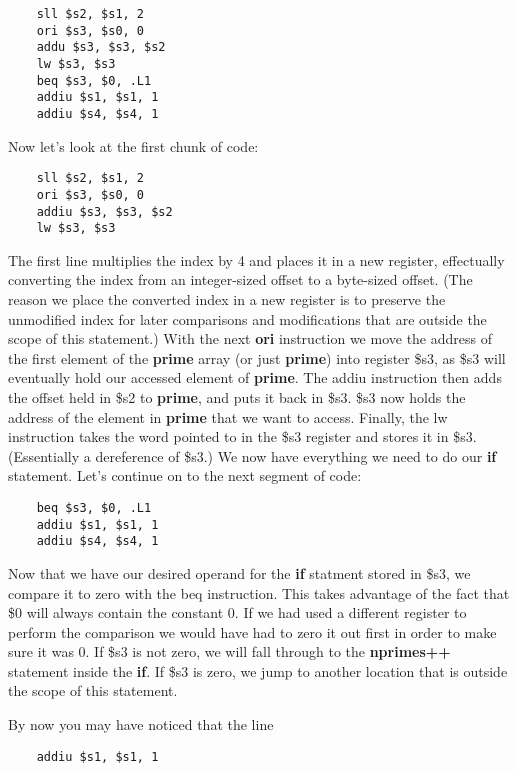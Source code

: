 \documentclass[11pt]{article}
\begin{document}
\begin{verbatim}
    sll $s2, $s1, 2
    ori $s3, $s0, 0
    addu $s3, $s3, $s2
    lw $s3, $s3
    beq $s3, $0, .L1
    addiu $s1, $s1, 1
    addiu $s4, $s4, 1
\end{verbatim}

Now let's look at the first chunk of code:

\begin{verbatim}
    sll $s2, $s1, 2
    ori $s3, $s0, 0
    addiu $s3, $s3, $s2
    lw $s3, $s3
\end{verbatim}

The first line multiplies the index by 4 and places it in a new register, effectually converting the index from an integer-sized offset to a byte-sized offset. (The reason we place the converted index in a new register is to preserve the unmodified index for later comparisons and modifications that are outside the scope of this statement.) With the next \textbf{ori} instruction we move the address of the first element of the \textbf{prime} array (or just \textbf{prime}) into register \$s3, as \$s3 will eventually hold our accessed element of \textbf{prime}. The addiu instruction then adds the offset held in \$s2 to \textbf{prime}, and puts it back in \$s3. \$s3 now holds the address of the element in \textbf{prime} that we want to access. Finally, the lw instruction takes the word pointed to in the \$s3 register and stores it in \$s3. (Essentially a dereference of \$s3.) We now have everything we need to do our \textbf{if} statement. Let's continue on to the next segment of code:

\begin{verbatim}
    beq $s3, $0, .L1
    addiu $s1, $s1, 1
    addiu $s4, $s4, 1
\end{verbatim}

Now that we have our desired operand for the \textbf{if} statment stored in \$s3, we compare it to zero with the beq instruction. This takes advantage of the fact that \$0 will always contain the constant 0. If we had used a different register to perform the comparison we would have had to zero it out first in order to make sure it was 0. If \$s3 is not zero, we will fall through to the \textbf{nprimes++} statement inside the \textbf{if}. If \$s3 is zero, we jump to another location that is outside the scope of this statement. 

By now you may have noticed that the line

\begin{verbatim}
    addiu $s1, $s1, 1
\end{verbatim}
\end{document}

